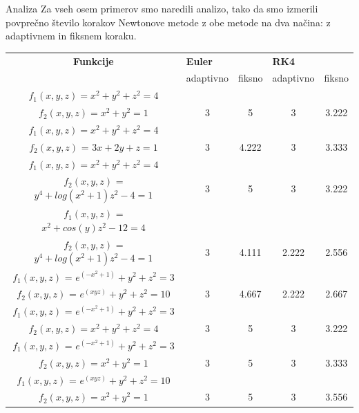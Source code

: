 \documentclass{beamer}
\begin{document}
	\begin{frame}{Analiza}
		Za vseh osem primerov smo naredili analizo, tako da smo izmerili povpre\v{c}no \v{s}tevilo korakov Newtonove metode z obe metode na dva na\v{c}ina: z adaptivnem in fiksnem koraku.
	\end{frame}
	\begin{frame}
 \begin{tabular}{|c | c | c | c | c |} 
 \hline
 \textbf{Funkcije} &\multicolumn{2}{|l|}{\textbf{Euler}} &\multicolumn{2}{|l|}{\textbf{RK4}}\\                
  \small &adaptivno & fiksno & adaptivno & fiksno \\ 
 \hline
 \tiny{}$f_{1}(x,y,z)=x^{2} + y^{2}+ z^{2}=4$ & & & &\\ 
 \tiny{}$f_{2}(x,y,z)=x^{2} + y^{2}    =1$  & 3 & 5 & 3 & 3.222 \\
 \hline
 \tiny{}$f_{1}(x,y,z)=x^{2} + y^{2}+ z^{2}=4$ & & & &\\ 
 \tiny{}$f_{2}(x,y,z)$ = $3x + 2y + z = 1$  & 3 & 4.222 & 3 & 3.333 \\
 \hline
 \tiny{}$f_{1}(x,y,z)=x^{2} + y^{2}+ z^{2}=4$ & & & &\\ 
 \tiny{}$f_{2}(x,y,z)$ = $y^4 + log(x^2 + 1)z^2 - 4 = 1$  & 3 & 5 & 3 & 3.222 \\
 \hline
 \tiny{}$f_{1}(x,y,z)$ = $x^2 + cos(y)z^2 - 12 = 4$ & & & &\\ 
\tiny{}$f_{2}(x,y,z)$ = $y^4 + log(x^2 + 1)z^2 - 4 = 1$  & 3 & 4.111 & 2.222 & 2.556 \\
 \hline
 \tiny{}$f_{1}(x,y,z)$ = $e^{(-x^{2}+1)}+y^{2}+z^{2} = 3$ & & & &\\ 
 \tiny{}$f_{2}(x,y,z)$ = $e^{(xyz)}+y^{2}+z^{2} = 10$  & 3 & 4.667 & 2.222 & 2.667 \\
 \hline
 \tiny{}$f_{1}(x,y,z)$ = $e^{(-x^{2}+1)}+y^{2}+z^{2} = 3$ & & & &\\ 
 \tiny{}$f_{2}(x,y,z)=x^{2} + y^{2}+ z^{2}=4$  & 3 & 5 & 3 & 3.222 \\
 \hline
 \tiny{}$f_{1}(x,y,z)$ = $e^{(-x^{2}+1)}+y^{2}+z^{2} = 3$ & & & &\\ 
  \tiny{}$f_{2}(x,y,z)=x^{2} + y^{2}    =1$  & 3 & 5 & 3 & 3.333 \\
  \hline
\tiny{}$f_{1}(x,y,z)$ = $e^{(xyz)}+y^{2}+z^{2} = 10$ & & & &\\ 
 \tiny{}$f_{2}(x,y,z)=x^{2} + y^{2}    =1$  & 3 & 5 & 3 & 3.556 \\
  \hline
\end{tabular}
	\end{frame}
	
\end{document}
